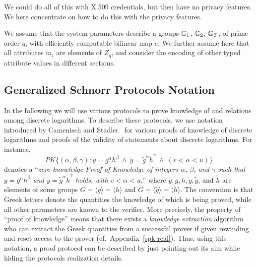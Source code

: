 
We could do all of this with X.509 credentials, but then have no privacy features. 
We here concentrate on how to do this with the privacy features.


We assume that the system parameters describe a groups $\mathbb{G}_1$, $\mathbb{G}_2$, $\mathbb{G}_T$, of prime order $q$, with efficiently computable bilinear map $e$.
We further assume here that all attributes $m_i$ are elements of $Z_q$, and consider the encoding of other typed attribute values in different sections.

\subsection{Generalized Schnorr Protocols Notation}


In the following we will use various protocols to prove knowledge of and relations 
among discrete logarithms.
To describe these protocols, we use  notation introduced by Camenisch and
Stadler~\cite{camsta97b} for various proofs of knowledge of discrete
logarithms and proofs of the validity of statements about discrete logarithms.
For instance,
\[\textit{PK}
\{ (\alpha,\beta,\gamma): y = g^\alpha h^\beta \ \wedge \ \tilde{y} =
\tilde{g}^\alpha \tilde{h}^\gamma \ \wedge \ ( v < \alpha < u) \}
\]
denotes a ``\textit{zero-knowledge \emph{P}roof of \emph{K}nowledge of
  integers $\alpha$, $\beta$, and $\gamma$ such that $y = g^\alpha h^\beta$
  and $\tilde{y} = \tilde{g}^\alpha \tilde{h}^\gamma$ holds, with $ v <
  \alpha < u$},'' where $y,g,h,\tilde{y},\tilde{g}$, and $\tilde{h}$ are
elements of some groups $G = \langle g\rangle = \langle h\rangle$ and
$\tilde{G} = \langle \tilde{g}\rangle = \langle \tilde{h} \rangle$.  
The
convention is that Greek letters denote the quantities the knowledge of which is
being proved, while all other parameters are known to the verifier. 
More precisely, the property of ``proof of knowledge'' means that there exists a
\emph{knowledge extraction} 
algorithm who can 
extract the Greek quantities from a successful prover if given rewinding and
reset access to the prover (cf.~Appendix~\ref{spk-real}).
Thus, using this
notation, a proof protocol can be described by just pointing out its aim while
hiding the protocols realization details.



